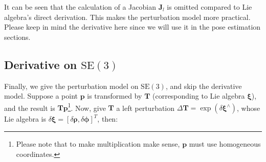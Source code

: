 It can be seen that the calculation of a Jacobian $\mathbf{J}_l$ is omitted compared to Lie algebra's direct derivation. This makes the perturbation model more practical. Please keep in mind the derivative here since we will use it in the pose estimation sections.


\subsection{Derivative on $\mathrm{SE}(3)$}
\label{sec:se3-diff}
Finally, we give the perturbation model on $\mathrm{SE}(3)$, and skip the derivative model. Suppose a point $\mathbf{p}$ is transformed by $\mathbf{T}$ (corresponding to Lie algebra $\boldsymbol{\xi}$), and the result is $\mathbf{Tp}$\footnote{Please note that to make multiplication make sense, $\mathbf{p}$ must use homogeneous coordinates. }. Now, give $\mathbf{T}$ a left perturbation $\Delta \mathbf{T} = \exp \left( \delta \boldsymbol{\xi}^\wedge \right)$, whose Lie algebra is $\delta \boldsymbol{\xi} = [\delta \boldsymbol{\rho}, \delta \boldsymbol{\phi}]^T$, then:

